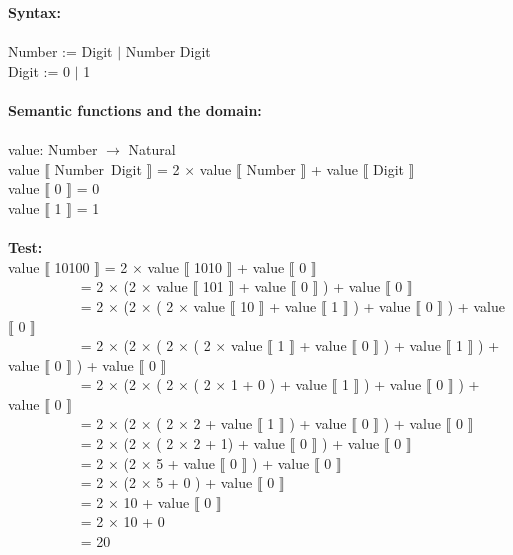 \textbf{Syntax:}\\ \\
Number := Digit $|$ Number Digit \\
Digit := 0 $|$ 1\\ \\
\textbf{Semantic functions and the domain:}\\ \\
value: Number $\rightarrow$ Natural \\
value $\llbracket$ Number~Digit $\rrbracket$ = 2 $\times$ value $\llbracket$ Number $\rrbracket$ + value $\llbracket$ Digit $\rrbracket$ \\
value $\llbracket$ 0 $\rrbracket$ = 0 \\
value $\llbracket$ 1 $\rrbracket$ = 1 \\ \\
\textbf{Test:}\\ 
value $\llbracket$ 10100 $\rrbracket$ = 2 $\times$ value $\llbracket$ 1010 $\rrbracket$  + value $\llbracket$ 0 $\rrbracket$ \\
$~~~~~~~~~~~~~~~~~~~~~~$ = 2 $\times$ (2 $\times$ value $\llbracket$ 101 $\rrbracket$ + value $\llbracket$ 0 $\rrbracket$ ) + value $\llbracket$ 0 $\rrbracket$ \\
$~~~~~~~~~~~~~~~~~~~~~~$ = 2 $\times$ (2 $\times$ ( 2 $\times$ value $\llbracket$ 10 $\rrbracket$ + value $\llbracket$ 1 $\rrbracket$ ) + value $\llbracket$ 0 $\rrbracket$ ) + value $\llbracket$ 0 $\rrbracket$ \\
$~~~~~~~~~~~~~~~~~~~~~~$ = 2 $\times$ (2 $\times$ ( 2 $\times$ ( 2 $\times$ value $\llbracket$ 1 $\rrbracket$ + value $\llbracket$ 0 $\rrbracket$ ) + value $\llbracket$ 1 $\rrbracket$ ) + value $\llbracket$ 0 $\rrbracket$ ) + value $\llbracket$ 0 $\rrbracket$ \\
$~~~~~~~~~~~~~~~~~~~~~~$ = 2 $\times$ (2 $\times$ ( 2 $\times$ ( 2 $\times$ 1 + 0 ) + value $\llbracket$ 1 $\rrbracket$ ) + value $\llbracket$ 0 $\rrbracket$ ) + value $\llbracket$ 0 $\rrbracket$ \\
$~~~~~~~~~~~~~~~~~~~~~~$ = 2 $\times$ (2 $\times$ ( 2 $\times$ 2 + value $\llbracket$ 1 $\rrbracket$ ) + value $\llbracket$ 0 $\rrbracket$ ) + value $\llbracket$ 0 $\rrbracket$ \\
$~~~~~~~~~~~~~~~~~~~~~~$ = 2 $\times$ (2 $\times$ ( 2 $\times$ 2 + 1) + value $\llbracket$ 0 $\rrbracket$ ) + value $\llbracket$ 0 $\rrbracket$ \\
$~~~~~~~~~~~~~~~~~~~~~~$ = 2 $\times$ (2 $\times$ 5 + value $\llbracket$ 0 $\rrbracket$ ) + value $\llbracket$ 0 $\rrbracket$ \\
$~~~~~~~~~~~~~~~~~~~~~~$ = 2 $\times$ (2 $\times$ 5 + 0 ) + value $\llbracket$ 0 $\rrbracket$ \\
$~~~~~~~~~~~~~~~~~~~~~~$ = 2 $\times$ 10 + value $\llbracket$ 0 $\rrbracket$ \\
$~~~~~~~~~~~~~~~~~~~~~~$ = 2 $\times$ 10 + 0 \\
$~~~~~~~~~~~~~~~~~~~~~~$ = 20
